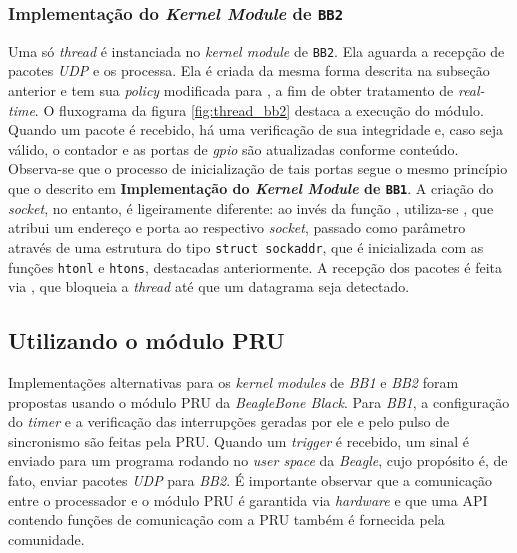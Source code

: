 % 

\subsubsection{Implementação do \textit{Kernel Module} de \texttt{BB2}}

Uma só \textit{thread} é instanciada no \textit{kernel module} de \texttt{BB2}.
Ela aguarda a recepção de pacotes \textit{UDP} e os processa. Ela é criada da
mesma forma descrita na subseção anterior e tem sua \textit{policy} modificada
para , a fim de obter tratamento de \textit{real-time}. O
fluxograma da figura \ref{fig:thread_bb2} destaca a execução do módulo. Quando
um pacote é recebido, há uma verificação de sua integridade e, caso seja válido,
o contador e as portas de \textit{gpio} são atualizadas conforme conteúdo.
Observa-se que o processo de inicialização de tais portas segue o mesmo
princípio que o descrito em \textbf{Implementação do \textit{Kernel Module} de
\texttt{BB1}}. A criação do \textit{socket}, no entanto, é ligeiramente
diferente: ao invés da função , utiliza-se , que
atribui um endereço e porta ao respectivo \textit{socket}, passado como
parâmetro através de uma estrutura do tipo \texttt{struct sockaddr}, que é
inicializada com as funções \texttt{htonl} e \texttt{htons}, destacadas
anteriormente. A recepção dos pacotes é feita via , que
bloqueia a \textit{thread} até que um datagrama seja detectado.
% 
% 


\subsection{Utilizando o módulo PRU}

Implementações alternativas para os \textit{kernel modules} de \textit{BB1} e
\textit{BB2} foram propostas usando o módulo PRU da \textit{BeagleBone Black}.
Para \textit{BB1}, a configuração do \textit{timer} e a verificação das
interrupções geradas por ele e pelo pulso de sincronismo são feitas pela PRU.
Quando um \textit{trigger} é recebido, um sinal é enviado para um programa
rodando no \textit{user space} da \textit{Beagle}, cujo propósito é, de fato,
enviar pacotes \textit{UDP} para \textit{BB2}. É importante observar que a
comunicação entre o processador e o módulo PRU é garantida via \textit{hardware}
e que uma API contendo funções de comunicação com a PRU também é fornecida pela
comunidade.

